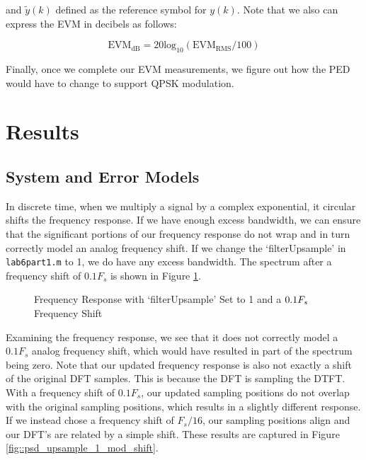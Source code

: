 \documentclass{article}
\begin{document}
\noindent and $\tilde{y}(k)$ defined as the reference symbol for $y(k)$. Note that we also can express the EVM in decibels as follows:

\begin{equation}
	\text{EVM}_\text{dB} = 20\text{log}_{10}(\text{EVM}_\text{RMS}/100)
\end{equation}

\noindent Finally, once we complete our EVM measurements, we figure out how the PED would have to change to support QPSK modulation.

\section{Results}

\subsection{System and Error Models}

In discrete time, when we multiply a signal by a complex exponential, it circular shifts the frequency response. If we have enough excess bandwidth, we can ensure that the significant portions of our frequency response do not wrap and in turn correctly model an analog frequency shift. If we change the `filterUpsample' in \texttt{lab6part1.m} to 1, we do have any excess bandwidth. The spectrum after a frequency shift of $0.1F_s$ is shown in Figure \ref{fig::psd_upsample_1}.

\begin{figure}[H]
	\centerline{}
	\caption{Frequency Response with `filterUpsample' Set to 1 and a $\protect{0.1F_s}$ Frequency Shift}
	\label{fig::psd_upsample_1}
\end{figure}

\noindent Examining the frequency response, we see that it does not correctly model a $0.1F_s$ analog frequency shift, which would have resulted in part of the spectrum being zero. Note that our updated frequency response is also not exactly a shift of the original DFT samples. This is because the DFT is sampling the DTFT. With a frequency shift of $0.1F_s$, our updated sampling positions do not overlap with the original sampling positions, which results in a slightly different response. If we instead chose a frequency shift of $F_s/16$, our sampling positions align and our DFT's are related by a simple shift. These results are captured in Figure \ref{fig::psd_upsample_1_mod_shift}.
\end{document}
